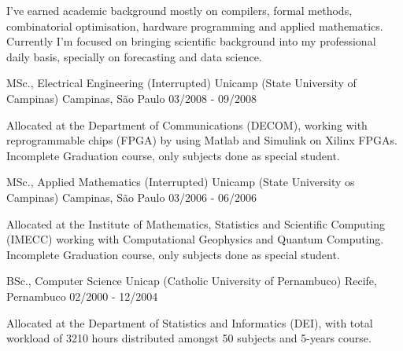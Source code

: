 
\begin{cvparagraph}
I've earned academic background mostly on compilers, formal methods, combinatorial optimisation, hardware programming and applied mathematics. Currently I'm focused on bringing scientific background into my professional daily basis, specially on forecasting and data science.
\end{cvparagraph}


\begin{cventries}

\cventry
    {MSc., Electrical Engineering (Interrupted)} %
    {Unicamp (State University of Campinas)} %
    {Campinas, São Paulo} %
    {03/2008 - 09/2008} %
    {
      \begin{cvitems} %
        \item Allocated at the Department of Communications (DECOM), working with reprogrammable chips (FPGA) by using Matlab and Simulink on Xilinx FPGAs. Incomplete Graduation course, only subjects done as special student.
      \end{cvitems}
    }

\cventry
        {MSc., Applied Mathematics (Interrupted)}
        {Unicamp (State University os Campinas)}
        {Campinas, São Paulo}
        {03/2006 - 06/2006}
        {
         \begin{cvitems}
           \item {Allocated at the Institute of Mathematics, Statistics and Scientific Computing (IMECC) working with Computational Geophysics and Quantum Computing. Incomplete Graduation course, only subjects done as special student.}
          \end{cvitems}
        }

\cventry
        {BSc., Computer Science}
        {Unicap (Catholic University of Pernambuco)}
        {Recife, Pernambuco}
        {02/2000 - 12/2004}
        {
        \begin{cvitems}
                \item Allocated at the Department of Statistics and Informatics (DEI), with total workload of 3210 hours distributed amongst 50 subjects and 5-years course.
        \end{cvitems}
        }

\end{cventries}

